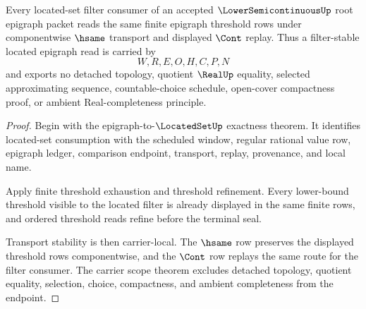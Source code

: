 \begin{theorem}
\label{thm:lowersemicontinuous-located-epigraph-filter-stability}
Every located-set filter consumer of an accepted $\LowerSemicontinuousUp$ root epigraph packet reads the same finite epigraph threshold rows under componentwise $\hsame$ transport and displayed $\Cont$ replay. Thus a filter-stable located epigraph read is carried by
$$
W,R,E,O,H,C,P,N
$$
and exports no detached topology, quotient $\RealUp$ equality, selected approximating sequence, countable-choice schedule, open-cover compactness proof, or ambient Real-completeness principle.
\end{theorem}
\begin{proof}
Begin with the epigraph-to-$\LocatedSetUp$ exactness theorem. It identifies located-set consumption with the scheduled window, regular rational value row, epigraph ledger, comparison endpoint, transport, replay, provenance, and local name.

Apply finite threshold exhaustion and threshold refinement. Every lower-bound threshold visible to the located filter is already displayed in the same finite rows, and ordered threshold reads refine before the terminal seal.

Transport stability is then carrier-local. The $\hsame$ row preserves the displayed threshold rows componentwise, and the $\Cont$ row replays the same route for the filter consumer. The carrier scope theorem excludes detached topology, quotient equality, selection, choice, compactness, and ambient completeness from the endpoint.
\end{proof}

